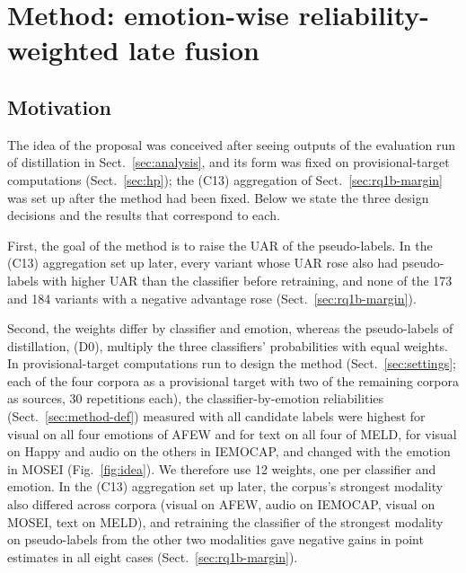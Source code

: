 \FloatBarrier
\section{Method: emotion-wise reliability-weighted late fusion}\label{sec:method}

\subsection{Motivation}\label{sec:idea}
The idea of the proposal was conceived after seeing outputs of the evaluation run of distillation in Sect.~\ref{sec:analysis}, and its form was fixed on provisional-target computations (Sect.~\ref{sec:hp}); the (C13) aggregation of Sect.~\ref{sec:rq1b-margin} was set up after the method had been fixed. Below we state the three design decisions and the results that correspond to each.

First, the goal of the method is to raise the UAR of the pseudo-labels. In the (C13) aggregation set up later, every variant whose UAR rose also had pseudo-labels with higher UAR than the classifier before retraining, and none of the 173 and 184 variants with a negative advantage rose (Sect.~\ref{sec:rq1b-margin}).

Second, the weights differ by classifier and emotion, whereas the pseudo-labels of distillation, (D0), multiply the three classifiers' probabilities with equal weights. In provisional-target computations run to design the method (Sect.~\ref{sec:settings}; each of the four corpora as a provisional target with two of the remaining corpora as sources, 30 repetitions each), the classifier-by-emotion reliabilities (Sect.~\ref{sec:method-def}) measured with all candidate labels were highest for visual on all four emotions of AFEW and for text on all four of MELD, for visual on Happy and audio on the others in IEMOCAP, and changed with the emotion in MOSEI (Fig.~\ref{fig:idea}). We therefore use 12 weights, one per classifier and emotion. In the (C13) aggregation set up later, the corpus's strongest modality also differed across corpora (visual on AFEW, audio on IEMOCAP, visual on MOSEI, text on MELD), and retraining the classifier of the strongest modality on pseudo-labels from the other two modalities gave negative gains in point estimates in all eight cases (Sect.~\ref{sec:rq1b-margin}).

